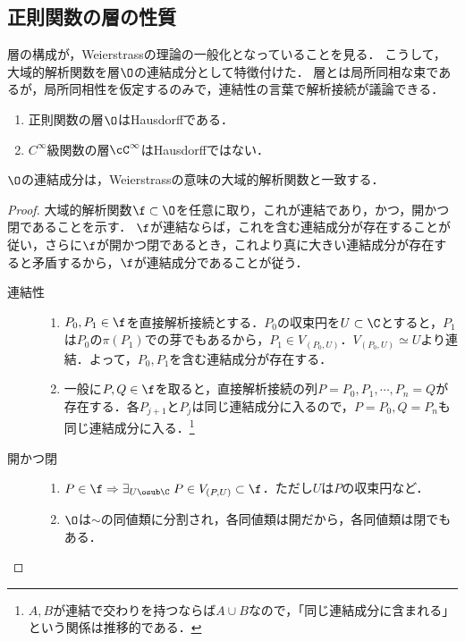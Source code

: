 \documentclass[uplatex, dvipdfmx]{jsreport}
\begin{document}
\subsection{正則関数の層の性質}

\begin{tcolorbox}[colframe=ForestGreen, colback=ForestGreen!10!white,breakable,colbacktitle=ForestGreen!40!white,coltitle=black,fonttitle=\bfseries\sffamily,
title=]
    層の構成が，Weierstrassの理論の一般化となっていることを見る．
    こうして，大域的解析関数を層$\O$の連結成分として特徴付けた．
    層とは局所同相な束であるが，局所同相性を仮定するのみで，連結性の言葉で解析接続が議論できる．
\end{tcolorbox}

\begin{proposition}\mbox{}\label{prop-sheaf-of-holomorphic-functions-is-Hausdorff}
    \begin{enumerate}
        \item 正則関数の層$\O$はHausdorffである．
        \item $C^\infty$級関数の層$\cC^\infty$はHausdorffではない．
    \end{enumerate}
\end{proposition}

\begin{theorem}[大域的解析関数の特徴付け]
    $\O$の連結成分は，Weierstrassの意味の大域的解析関数と一致する．
\end{theorem}
\begin{proof}
    大域的解析関数$\f\subset\O$を任意に取り，これが連結であり，かつ，開かつ閉であることを示す．
    $\f$が連結ならば，これを含む連結成分が存在することが従い，さらに$\f$が開かつ閉であるとき，これより真に大きい連結成分が存在すると矛盾するから，$\f$が連結成分であることが従う．
    \begin{description}
        \item[連結性] 
        \begin{enumerate}
            \item $P_0,P_1\in\f$を直接解析接続とする．$P_0$の収束円を$U\subset\C$とすると，$P_1$は$P_0$の$\pi(P_1)$での芽でもあるから，$P_1\in V_{(P_0,U)}$．$V_{(P_0,U)}\simeq U$より連結．よって，$P_0,P_1$を含む連結成分が存在する．
            \item 一般に$P,Q\in\f$を取ると，直接解析接続の列$P=P_0,P_1,\cdots,P_n=Q$が存在する．各$P_{j+1}$と$P_j$は同じ連結成分に入るので，$P=P_0,Q=P_n$も同じ連結成分に入る．\footnote{$A,B$が連結で交わりを持つならば$A\cup B$なので，「同じ連結成分に含まれる」という関係は推移的である．}
        \end{enumerate}
        \item[開かつ閉]
        \begin{enumerate}
            \item $P\in\f\Rightarrow \exists_{U\osub\C}\;P\in V_{(P,U)}\subset\f$．ただし$U$は$P$の収束円など．
            \item $\O$は$\sim$の同値類に分割され，各同値類は開だから，各同値類は閉でもある．
        \end{enumerate}
    \end{description}
\end{proof}
\end{document}
